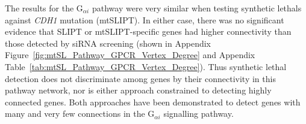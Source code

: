 \begin{table*}[!htb]
\caption{\acrshort{ANOVA} for synthetic lethality and vertex degree}
\label{tab:SL_Pathway_GPCR_Vertex_Degree}
\noindent{}
\end{table*} \filbreak

The results for the G$_{\alpha i}$ \gls{pathway} were very similar when testing \glspl{synthetic lethal} against \textit{CDH1} \gls{mutation} (\acrshort{mtSLIPT}). In either case, there was no significant evidence that \gls{SLIPT} or \acrshort{mtSLIPT}-specific genes had higher connectivity than those detected by \gls{siRNA} screening (shown in Appendix Figure~\ref{fig:mtSL_Pathway_GPCR_Vertex_Degree} and Appendix Table~\ref{tab:mtSL_Pathway_GPCR_Vertex_Degree}). Thus \gls{synthetic lethal} detection does not discriminate among genes by their connectivity in this \gls{pathway} network, nor is either approach constrained to detecting highly connected genes. Both approaches have been demonstrated to detect genes with many and very few connections in the G$_{\alpha i}$ signalling \gls{pathway}.

\FloatBarrier


